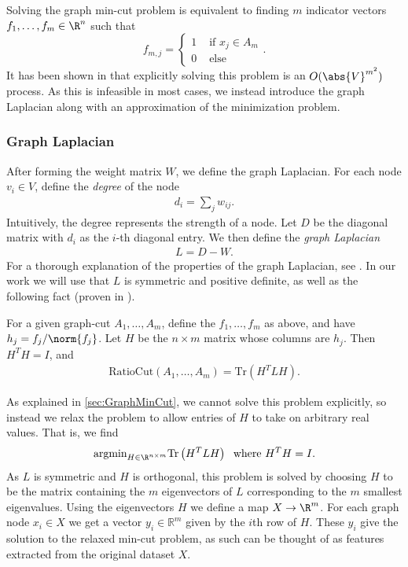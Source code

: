 \documentclass{article}
\begin{document}
Solving the graph min-cut problem is equivalent to finding $m$ indicator vectors
$f_1,\ldots,f_m \in \R^n$ such that
\[f_{m,j} = \begin{cases} 1 & \text{ if } x_j \in A_m \\ 0 & \text{ else}
  \end{cases}.\] It has been shown in \cite{Goldschmidt94} that explicitly
solving this problem is an $O(\abs{V}^{m^2})$ process. As this is infeasible in
most cases, we instead introduce the graph Laplacian along with an approximation
of the minimization problem.

\subsubsection{Graph Laplacian} \label{subsec:GraphLaplacian} After forming the
weight matrix $W$, we define the graph Laplacian. For each node $v_i\in V$,
define the \emph{degree} of the node
\begin{align}d_i = \sum_j w_{ij}.\end{align} Intuitively, the degree represents the strength of a
node. Let $D$ be the diagonal matrix with $d_i$ as the $i$-th diagonal entry. We
then define the \emph{graph Laplacian}
\begin{align}
  L = D - W.
\end{align}
For a thorough explanation of the properties of the graph Laplacian, see
\cite{Mohar91}. In our work we will use that $L$ is symmetric and positive
definite, as well as the following fact (proven in \cite{vonLuxburg07}).
\begin{fact}
  For a given graph-cut $A_1,\ldots,A_m$, define the $f_1,\ldots,f_m$ as above,
  and have $h_j = f_j/\norm{f_j}$. Let $H$ be the $n\times m$ matrix whose
  columns are $h_j$. Then $H^T H = I$, and
  \begin{align}
    \text{RatioCut}(A_1,\ldots,A_m) = \text{Tr}\left(H^T L H\right).
  \end{align}
\end{fact}
As explained in \ref{sec:GraphMinCut}, we cannot solve this problem explicitly,
so instead we relax the problem to allow entries of $H$ to take on arbitrary
real values. That is, we find
\begin{align}
  \text{argmin}_{H\in \R^{n\times m}} \text{Tr}\left(H^T L H\right)\;\text{
  where }H^TH=I.
\end{align}
As $L$ is symmetric and $H$ is orthogonal, this problem is solved by choosing
$H$ to be the matrix containing the $m$ eigenvectors of $L$ corresponding to the
$m$ smallest eigenvalues. Using the eigenvectors $H$ we define a map
$X \to \R^m$. For each graph node $x_i\in X$ we get a vector
$y_i\in\mathbb{R}^m$ given by the $i$th row of $H$. These $y_i$ give the
solution to the relaxed min-cut problem, as such can be thought of as features
extracted from the original dataset $X$.
\end{document}
